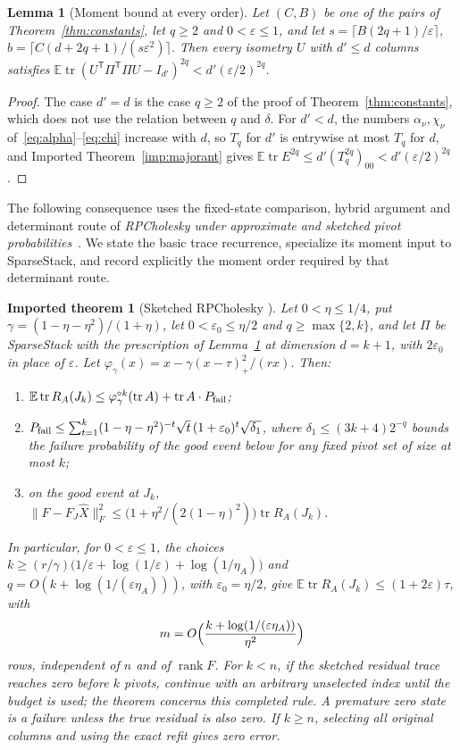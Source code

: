 \documentclass[11pt,a4paper]{article}
\newtheorem{lemma}[theorem]{Lemma}
\newtheorem{imported}[theorem]{Imported theorem}
\theoremstyle{definition}
\theoremstyle{remark}
\newcommand{\E}{\mathbb E}
\newcommand{\tr}{\operatorname{tr}}
\newcommand{\rank}{\operatorname{rank}}
\newcommand{\eps}{\varepsilon}
\newcommand{\norm}[1]{\lVert#1\rVert}
\newcommand{\1}{\mathbf 1}
\newcommand{\T}{\mathsf T}
\begin{document}
\begin{lemma}[Moment bound at every order]\label{lem:moment-any-q}
Let $(C,B)$ be one of the pairs of Theorem~\ref{thm:constants}, let
$q\ge2$ and $0<\eps\le1$, and let $s=\lceil B(2q+1)/\eps\rceil$,
$b=\lceil C(d+2q+1)/(s\eps^2)\rceil$. Then every isometry $U$ with
$d'\le d$ columns satisfies $\E\tr(U^\T\Pi^\T\Pi U-I_{d'})^{2q}<d'(\eps/2)^{2q}$.
\end{lemma}
\begin{proof}
The case $d'=d$ is the case $q\ge2$ of the proof of
Theorem~\ref{thm:constants}, which does not use the relation between $q$
and $\delta$. For $d'<d$, the numbers $\alpha_\nu,\chi_\nu$
of~\eqref{eq:alpha}--\eqref{eq:chi} increase with $d$, so $T_q$ for $d'$
is entrywise at most $T_q$ for $d$, and Imported
Theorem~\ref{imp:majorant} gives
$\E\tr E^{2q}\le d'(T_q^{2q})_{00}<d'(\eps/2)^{2q}$.
\end{proof}

The following consequence uses the fixed-state comparison, hybrid
argument and determinant route of \emph{RPCholesky under approximate
and sketched pivot probabilities}~\cite{RobustRP}. We state the basic
trace recurrence, specialize its moment input to SparseStack, and
record explicitly the moment order required by that determinant route.

\begin{imported}[Sketched RPCholesky {\cite{RobustRP}}]\label{thm:sketchedrp}
Let $0<\eta\le1/4$, put $\gamma=(1-\eta-\eta^2)/(1+\eta)$, let
$0<\eps_0\le\eta/2$ and $q\ge\max\{2,k\}$, and let $\Pi$ be SparseStack with the
prescription of Lemma~\ref{lem:moment-any-q} at dimension $d=k+1$, with
$2\eps_0$ in place of $\eps$.
Let $\varphi_\gamma(x)=x-\gamma(x-\tau)_+^2/(rx)$. Then:
\begin{enumerate}[leftmargin=2em,label=(\roman*)]
\item $\E\tr R_A(J_k)\le\varphi_\gamma^{\circ k}(\tr A)+\tr A\cdot P_{\rm fail}$;
\item $P_{\rm fail}\le\sum_{t=1}^k(1-\eta-\eta^2)^{-t}\sqrt t\,(1+\eps_0)^t\sqrt{\delta_1}$,
 where $\delta_1\le(3k+4)2^{-q}$ bounds the failure probability of the
 good event below for any fixed pivot set of size at most $k$;
\item on the good event at $J_k$,
 $\norm{F-F_J\widehat X}_F^2\le\bigl(1+\eta^2/(2(1-\eta)^2)\bigr)\tr R_A(J_k)$.
\end{enumerate}
In particular, for $0<\eps\le1$, the choices
$k\ge(r/\gamma)\bigl(1/\eps+\log(1/\eps)+\log(1/\eta_A)\bigr)$
and $q=O(k+\log(1/(\eps\eta_A)))$, with $\eps_0=\eta/2$, give
$\E\tr R_A(J_k)\le(1+2\eps)\tau$, with
\[
 m=O\Bigl(\frac{k+\log(1/(\eps\eta_A))}{\eta^2}\Bigr)
\]
rows, independent of $n$ and of $\rank F$. For $k<n$, if the sketched
residual trace reaches zero before $k$ pivots, continue with an arbitrary
unselected index until the budget is used; the theorem concerns this
completed rule. A premature zero state is a failure unless the true
residual is also zero. If $k\ge n$, selecting all original columns and
using the exact refit gives zero error.
\end{imported}
\end{document}
